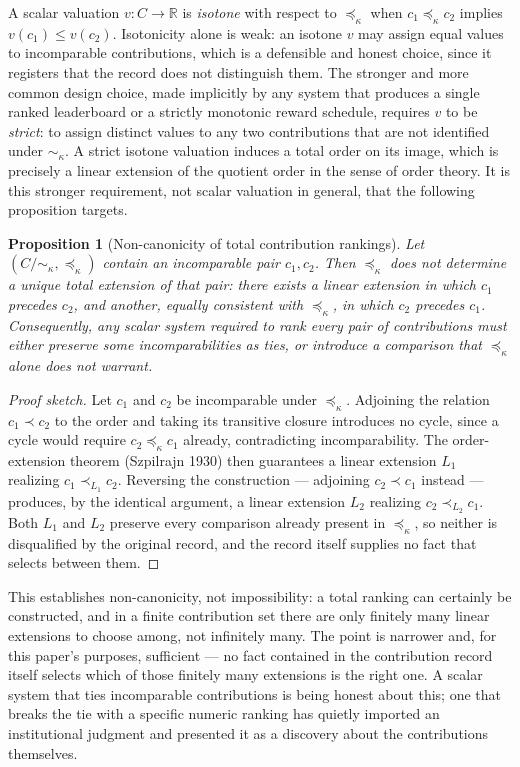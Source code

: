 \documentclass[11pt,oneside]{article}
\theoremstyle{plain}
\newtheorem{proposition}{Proposition}
\theoremstyle{definition}
\begin{document}
A scalar valuation $v : C \to \mathbb{R}$ is \emph{isotone} with respect to $\preceq_\kappa$ when $c_1 \preceq_\kappa c_2$ implies $v(c_1) \leq v(c_2)$. Isotonicity alone is weak: an isotone $v$ may assign equal values to incomparable contributions, which is a defensible and honest choice, since it registers that the record does not distinguish them. The stronger and more common design choice, made implicitly by any system that produces a single ranked leaderboard or a strictly monotonic reward schedule, requires $v$ to be \emph{strict}: to assign distinct values to any two contributions that are not identified under $\sim_\kappa$. A strict isotone valuation induces a total order on its image, which is precisely a linear extension of the quotient order in the sense of order theory. It is this stronger requirement, not scalar valuation in general, that the following proposition targets.

\begin{proposition}[Non-canonicity of total contribution rankings]
Let $(C/{\sim_\kappa}, \preceq_\kappa)$ contain an incomparable pair $c_1, c_2$. Then $\preceq_\kappa$ does not determine a unique total extension of that pair: there exists a linear extension in which $c_1$ precedes $c_2$, and another, equally consistent with $\preceq_\kappa$, in which $c_2$ precedes $c_1$. Consequently, any scalar system required to rank every pair of contributions must either preserve some incomparabilities as ties, or introduce a comparison that $\preceq_\kappa$ alone does not warrant.
\end{proposition}

\begin{proof}[Proof sketch]
Let $c_1$ and $c_2$ be incomparable under $\preceq_\kappa$. Adjoining the relation $c_1 \prec c_2$ to the order and taking its transitive closure introduces no cycle, since a cycle would require $c_2 \preceq_\kappa c_1$ already, contradicting incomparability. The order-extension theorem (Szpilrajn 1930) then guarantees a linear extension $L_1$ realizing $c_1 \prec_{L_1} c_2$. Reversing the construction --- adjoining $c_2 \prec c_1$ instead --- produces, by the identical argument, a linear extension $L_2$ realizing $c_2 \prec_{L_2} c_1$. Both $L_1$ and $L_2$ preserve every comparison already present in $\preceq_\kappa$, so neither is disqualified by the original record, and the record itself supplies no fact that selects between them.
\end{proof}

This establishes non-canonicity, not impossibility: a total ranking can certainly be constructed, and in a finite contribution set there are only finitely many linear extensions to choose among, not infinitely many. The point is narrower and, for this paper's purposes, sufficient --- no fact contained in the contribution record itself selects which of those finitely many extensions is the right one. A scalar system that ties incomparable contributions is being honest about this; one that breaks the tie with a specific numeric ranking has quietly imported an institutional judgment and presented it as a discovery about the contributions themselves.
\end{document}
